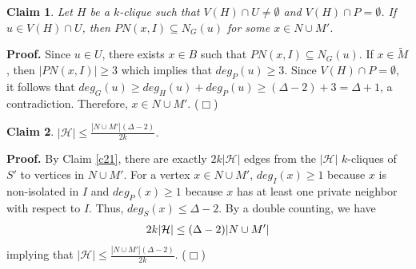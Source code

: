 \documentclass[11pt]{article}
\newtheorem{claim}{Claim}
\newcommand{\smallqed}{{\tiny ($\Box$)}}
\newcommand{\proof}{\noindent\textbf{Proof. }}
\newcommand{\2}{ \vspace{0.2cm} }
\newcommand{\1}{ \vspace{0.1cm} }
\begin{document}



\begin{claim}
\label{c24}
Let $H$ be a $k$-clique such that $V(H) \cap U \neq \emptyset$ and $V(H) \cap P = \emptyset$. If $u \in V(H) \cap U$, then $PN(x, I) \subseteq N_{G}(u)$ for some $x \in N \cup M'$.
\end{claim}
\proof
Since $u \in U$, there exists $x \in B$ such that $PN(x, I) \subseteq N_{G}(u)$. If $x \in \tilde{M}$, then $|PN(x, I)| \geq 3$ which implies that $deg_{P}(u) \geq 3$. Since $V(H) \cap P = \emptyset$, it follows that $deg_{G}(u) \geq deg_{H}(u) + deg_{P}(u) \geq (\Delta - 2) + 3 = \Delta + 1$, a contradiction. Therefore, $x \in N \cup M'$.
\smallqed


\begin{claim}\label{c22}
$|\mathcal{H}| \leq \frac{|N \cup M'|(\Delta - 2)}{2k}$.
\end{claim}
\proof By Claim \ref{c21}, there are exactly $2k|\mathcal{H}|$ edges from the $|\mathcal{H}|$ $k$-cliques of $S'$ to vertices in $N \cup M'$. For a vertex $x \in N \cup M'$, $deg_{I}(x) \geq 1$ because $x$ is non-isolated  in $I$ and $deg_{P}(x) \geq 1$ because $x$ has at least one private neighbor with respect to $I$. Thus, $deg_{S}(x) \leq \Delta - 2$. By a double counting, we have
\begin{align}
2k|\mathcal{H}| \leq (\Delta - 2)|N \cup M'|\notag
\end{align}
\noindent implying that $|\mathcal{H}| \leq \frac{|N \cup M'|(\Delta - 2)}{2k}$.
\smallqed
\end{document}
